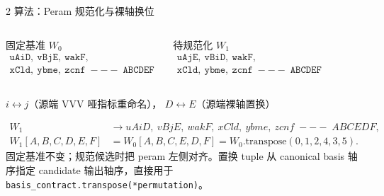 \documentclass[aspectratio=169,UTF8,fontset=fandol]{ctexbeamer}
\newcommand{\smallnote}[1]{{\scriptsize\color{Muted}#1}}
\begin{document}
\begin{frame}{2 算法：Peram 规范化与裸轴换位}
\small
\begin{columns}[T,onlytextwidth]
\begin{block}{固定基准 \(W_0\)}
\scriptsize
\[
\begin{array}{l}
\mathtt{uAiD,\ vBjE,\ wakF,}\\
\mathtt{xCld,\ ybme,\ zcnf\;---\;ABCDEF}
\end{array}
\]
\end{block}
\begin{block}{待规范化 \(W_1\)}
\scriptsize
\[
\begin{array}{l}
\mathtt{uAjE,\ vBiD,\ wakF,}\\
\mathtt{xCld,\ ybme,\ zcnf\;---\;ABCDEF}
\end{array}
\]
\end{block}
\end{columns}
\vspace{0.15em}
\begin{center}
\(i\leftrightarrow j\)（源端 VVV 哑指标重命名），\qquad
\(D\leftrightarrow E\)（源端裸轴置换）
\end{center}
\[
\begin{aligned}
W_1&\longrightarrow uAiD,\ vBjE,\ wakF,\ xCld,\ ybme,\ zcnf\;---\;ABCEDF,\\
W_1[A,B,C,D,E,F]&=W_0[A,B,C,E,D,F]
=W_0.\mathrm{transpose}(0,1,2,4,3,5).
\end{aligned}
\]
\smallnote{固定基准不变；规范候选时把 peram 左侧对齐。置换 tuple 从 canonical basis 轴序指定 candidate 输出轴序，直接用于 \texttt{basis\_contract.transpose(*permutation)}。}
\end{frame}
\end{document}
